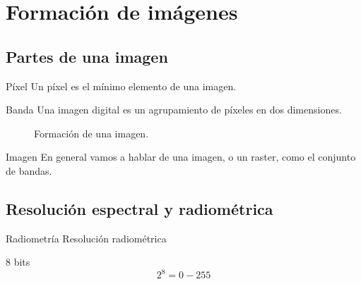\section{Formación de imágenes}
\subsection{Partes de una imagen}

\begin{frame}{}
\begin{block}{Píxel}
  Un píxel es el mínimo elemento de una imagen.
\end{block}\pause
\begin{block}{Banda}
  Una imagen digital es un agrupamiento de píxeles en dos dimensiones.
\end{block}
\end{frame}

\begin{frame}{}
  \begin{figure}
    \centering
    \caption{Formación de una imagen.}
    \label{}
  \end{figure}
\end{frame}



\begin{frame}{}
  \begin{block}{Imagen}
    En general vamos a hablar de una imagen, o un raster, como el conjunto de bandas.
  \end{block}
\end{frame}

\subsection{Resolución espectral y radiométrica}

\begin{frame}{}
  \begin{block}{Radiometría}
    Resolución radiométrica
  \end{block}
\end{frame}

\begin{frame}{}
  \begin{block}{8 bits}
   \begin{equation}
            2^8 = 0-255
        \end{equation}
  \end{block}
\end{frame}

